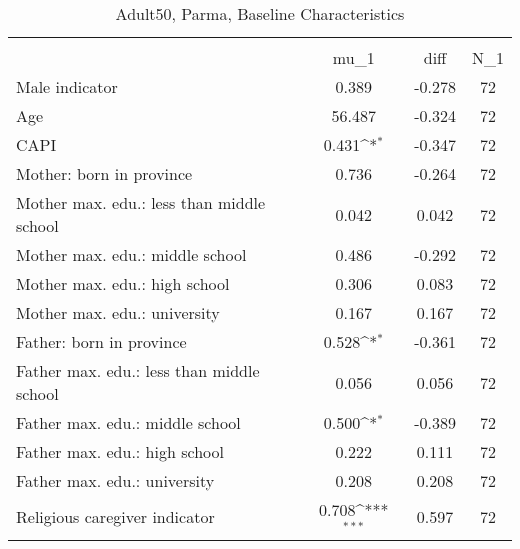 \begin{table}[htbp]\centering
\def\sym#1{\ifmmode^{#1}\else\(^{#1}\)\fi}
\caption{Adult50, Parma, Baseline Characteristics}
\begin{tabular}{l*{1}{ccc}}
\toprule
                    &\multicolumn{3}{c}{}                           \\
                    &        mu\_1         &        diff&         N\_1\\
\midrule
Male indicator      &       0.389         &      -0.278&          72\\
Age                 &      56.487         &      -0.324&          72\\
CAPI                &       0.431\sym{*}  &      -0.347&          72\\
Mother: born in province&       0.736         &      -0.264&          72\\
Mother max. edu.: less than middle school&       0.042         &       0.042&          72\\
Mother max. edu.: middle school&       0.486         &      -0.292&          72\\
Mother max. edu.: high school&       0.306         &       0.083&          72\\
Mother max. edu.: university&       0.167         &       0.167&          72\\
Father: born in province&       0.528\sym{*}  &      -0.361&          72\\
Father max. edu.: less than middle school&       0.056         &       0.056&          72\\
Father max. edu.: middle school&       0.500\sym{*}  &      -0.389&          72\\
Father max. edu.: high school&       0.222         &       0.111&          72\\
Father max. edu.: university&       0.208         &       0.208&          72\\
Religious caregiver indicator&       0.708\sym{***}&       0.597&          72\\
\bottomrule
\end{tabular}
\end{table}
